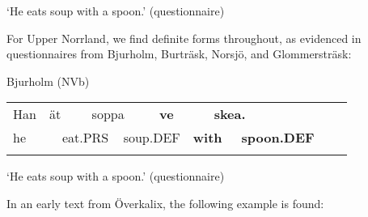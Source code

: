 \begin{styleTranslation}
‘He eats soup with a spoon.’ (questionnaire)

\end{styleTranslation}

\begin{styleBodyTextFirst}
For Upper Norrland, we find definite forms throughout, as evidenced in questionnaires from Bjurholm, Burträsk, Norsjö, and Glommersträsk:

\end{styleBodyTextFirst}

\begin{listWWNumileveli}
\item {}

\begin{styleExample}
Bjurholm (NVb)

\end{styleExample}

\end{listWWNumileveli}

\begin{tabular}{llllllllllll}
\lsptoprule
Han & \multicolumn{2}{l}{ät

} & \multicolumn{2}{l}{soppa

} & \multicolumn{2}{l}{{\bfseries ve}

} & \multicolumn{2}{l}{{\bfseries skea.}

} & \multicolumn{2}{l}{} & \\
\multicolumn{2}{l}{he

} & \multicolumn{2}{l}{eat.PRS

} & \multicolumn{2}{l}{soup.DEF

} & \multicolumn{2}{l}{{\bfseries with}

} & \multicolumn{2}{l}{{\bfseries spoon.DEF}

} & \multicolumn{2}{l}{}\\
\lspbottomrule
\end{tabular}

\begin{styleTranslation}
‘He eats soup with a spoon.’ (questionnaire)

\end{styleTranslation}

\begin{styleBodyTextFirst}
In an early text from Överkalix, the following example is found:

\end{styleBodyTextFirst}

